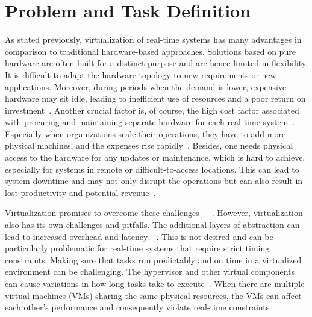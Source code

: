 \documentclass[MMR,Master,english]{style/twbook}
\begin{document}
\section{Problem and Task Definition}
As stated previously, virtualization of real-time systems has many advantages in comparison to traditional hardware-based approaches. Solutions based on pure hardware are often built for a distinct purpose and are hence limited in flexibility. It is difficult to adapt the hardware topology to new requirements or new applications. Moreover, during periods when the demand is lower, expensive hardware may sit idle, leading to inefficient use of resources and a poor return on investment~\cite{gabrielResourceAwareParameterTuning2019}. Another crucial factor is, of course, the high cost factor associated with procuring and maintaining separate hardware for each real-time system~\cite{bhardwajVirtualizationCloudComputing2021}. Especially when organizations scale their operations, they have to add more physical machines, and the expenses rise rapidly~\cite{abbasiExploringOpenStackScalable2023}. Besides, one needs physical access to the hardware for any updates or maintenance, which is hard to achieve, especially for systems in remote or difficult-to-access locations. This can lead to system downtime and may not only disrupt the operations but can also result in lost productivity and potential revenue~\cite{mahfoudRealTimePredictiveMaintenanceBased2024}.

\bigskip \noindent Virtualization promises to overcome these challenges~\cite{bhardwajVirtualizationCloudComputing2021}~\cite{queirozContainerbasedVirtualizationRealtime2024}~\cite{cinqueEvaluatingVirtualizationFog2023}. However, virtualization also has its own challenges and pitfalls. The additional layers of abstraction can lead to increased overhead and latency~\cite{casiniLatencyAnalysisVirtualization2021}~\cite{zhangEvaluatingOptimizingVirtualization2010}. This is not desired and can be particularly problematic for real-time systems that require strict timing constraints. Making sure that tasks run predictably and on time in a virtualized environment can be challenging. The hypervisor and other virtual components can cause variations in how long tasks take to execute~\cite{garcia-vallsChallengesRealtimeVirtualization2014}. When there are multiple virtual machines (VMs) sharing the same physical resources, the VMs can affect each other's performance and consequently violate real-time constraints~\cite{queirozContainerbasedVirtualizationRealtime2024}.
\end{document}

